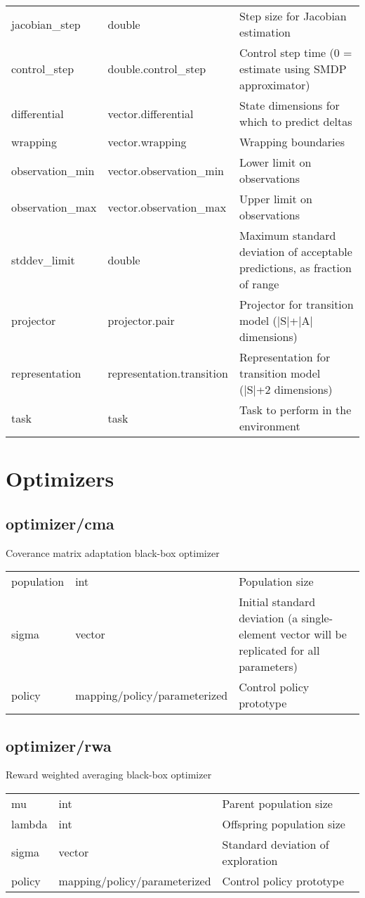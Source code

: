 \noindent\begin{tabular}{@{}lll@{}}
jacobian\_step&double&Step size for Jacobian estimation\\
control\_step&double.control\_step&Control step time (0 = estimate using SMDP approximator)\\
differential&vector.differential&State dimensions for which to predict deltas\\
wrapping&vector.wrapping&Wrapping boundaries\\
observation\_min&vector.observation\_min&Lower limit on observations\\
observation\_max&vector.observation\_max&Upper limit on observations\\
stddev\_limit&double&Maximum standard deviation of acceptable predictions, as fraction of range\\
projector&projector.pair&Projector for transition model (|S|+|A| dimensions)\\
representation&representation.transition&Representation for transition model (|S|+2 dimensions)\\
task&task&Task to perform in the environment\\
\end{tabular}
\section{Optimizers}
\subsection{optimizer/cma}
\noindent Coverance matrix adaptation black-box optimizer\\

\noindent\begin{tabular}{@{}lll@{}}
population&int&Population size\\
sigma&vector&Initial standard deviation (a single-element vector will be replicated for all parameters)\\
policy&mapping/policy/parameterized&Control policy prototype\\
\end{tabular}
\subsection{optimizer/rwa}
\noindent Reward weighted averaging black-box optimizer\\

\noindent\begin{tabular}{@{}lll@{}}
mu&int&Parent population size\\
lambda&int&Offspring population size\\
sigma&vector&Standard deviation of exploration\\
policy&mapping/policy/parameterized&Control policy prototype\\
\end{tabular}
